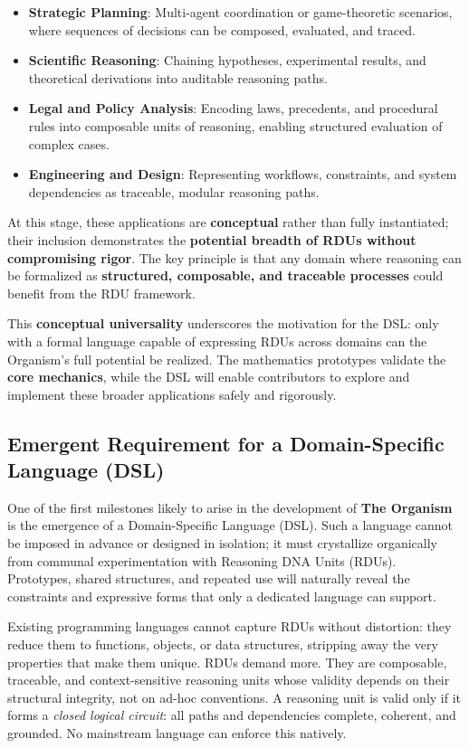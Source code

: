 \documentclass[12pt]{article}
\begin{document}
\begin{itemize}
    \item \textbf{Strategic Planning}: Multi-agent coordination or game-theoretic scenarios, where sequences of decisions can be composed, evaluated, and traced.
    \item \textbf{Scientific Reasoning}: Chaining hypotheses, experimental results, and theoretical derivations into auditable reasoning paths.
    \item \textbf{Legal and Policy Analysis}: Encoding laws, precedents, and procedural rules into composable units of reasoning, enabling structured evaluation of complex cases.
    \item \textbf{Engineering and Design}: Representing workflows, constraints, and system dependencies as traceable, modular reasoning paths.
\end{itemize}

At this stage, these applications are \textbf{conceptual} rather than fully instantiated; their inclusion demonstrates the \textbf{potential breadth of RDUs without compromising rigor}. The key principle is that any domain where reasoning can be formalized as \textbf{structured, composable, and traceable processes} could benefit from the RDU framework.

This \textbf{conceptual universality} underscores the motivation for the DSL: only with a formal language capable of expressing RDUs across domains can the Organism’s full potential be realized. The mathematics prototypes validate the \textbf{core mechanics}, while the DSL will enable contributors to explore and implement these broader applications safely and rigorously.

\subsection{Emergent Requirement for a Domain-Specific Language (DSL)}

One of the first milestones likely to arise in the development of \textbf{The Organism} is the emergence of a Domain-Specific Language (DSL). Such a language cannot be imposed in advance or designed in isolation; it must crystallize organically from communal experimentation with Reasoning DNA Units (RDUs). Prototypes, shared structures, and repeated use will naturally reveal the constraints and expressive forms that only a dedicated language can support.  

Existing programming languages cannot capture RDUs without distortion: they reduce them to functions, objects, or data structures, stripping away the very properties that make them unique. RDUs demand more. They are composable, traceable, and context-sensitive reasoning units whose validity depends on their structural integrity, not on ad-hoc conventions. A reasoning unit is valid only if it forms a \textit{closed logical circuit}: all paths and dependencies complete, coherent, and grounded. No mainstream language can enforce this natively.  
\end{document}
